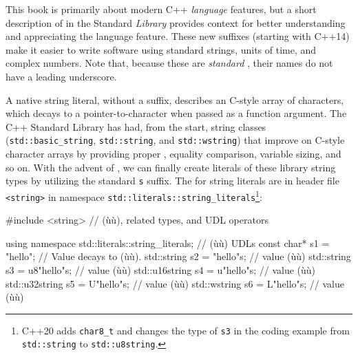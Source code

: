 This book is primarily about modern C++ \emph{language} features, but a
short description of  in the Standard
\emph{Library} provides context for better understanding and
appreciating the  language feature. These new suffixes
(starting with C++14) make it easier to write software using standard
strings, units of time, and complex numbers. Note that, because these
are \emph{standard} , their names do not have a
leading underscore.

A native string literal, without a suffix, describes an C-style array of
characters, which decays to a pointer-to-character when passed as a
function argument. The C++ Standard Library has had, from the start,
string classes (\lstinline!std::basic_string!, \lstinline!std::string!, and
\lstinline!std::wstring!) that improve on C-style character arrays by
providing proper , equality comparison, variable sizing,
and so on. With the advent of , we can finally create
literals of these library string types by utilizing the standard
\lstinline!s! suffix. The  for string literals are in
header file \lstinline!<string>! in namespace\linebreak%
\lstinline!std::literals::string_literals!{\cprotect\footnote{C++20 adds \lstinline!char8_t!
and changes the type of \lstinline!s3! in the coding example from \lstinline!std::string! to
\lstinline!std::u8string!.}}:

\begin{emcppslisting}[emcppsstandards=c++14]
#include <string>  // (ù{}ù), related types, and UDL operators

using namespace std::literals::string_literals;  // (ù{}ù) UDLs
const char*    s1 =   "hello";    // Value decays to (ù{}ù).
std::string    s2 =   "hello"s;   // value (ù{}ù)
std::string    s3 = u8"hello"s;   // value (ù{}ù)
std::u16string s4 =  u"hello"s;   // value (ù{}ù)
std::u32string s5 =  U"hello"s;   // value (ù{}ù)
std::wstring   s6 =  L"hello"s;   // value (ù{}ù)
\end{emcppslisting}

